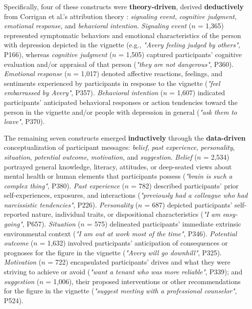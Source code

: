 Specifically, four of these constructs were \textbf{theory-driven}, derived \textbf{deductively} from Corrigan et al.'s attribution theory \cite{attribution_theory_corrigan_2000, theory_overview_corrigan_2002}: \textit{signaling event}, \textit{cognitive judgment}, \textit{emotional response}, and \textit{behavioral intention}.
\textit{Signaling event} ($n$ = 1,365) represented symptomatic behaviors and emotional characteristics of the person with depression depicted in the vignette (e.g., \textit{"Avery feeling judged by others"}, P166), whereas \textit{cognitive judgment} ($n$ = 1,505) captured participants' cognitive evaluation and/or appraisal of that person (\textit{"they are not dangerous"}, P360). 
\textit{Emotional response} ($n$ = 1,017) denoted affective reactions, feelings, and sentiments experienced by participants in response to the vignette (\textit{"feel embarrassed by Avery"}, P357). 
\textit{Behavioral intention} ($n$ = 1,607) indicated participants' anticipated behavioral responses or action tendencies toward the person in the vignette and/or people with depression in general (\textit{"ask them to leave"}, P370).


The remaining seven constructs emerged \textbf{inductively} through the \textbf{data-driven} conceptualization of participant messages: \textit{belief}, \textit{past experience}, \textit{personality}, \textit{situation}, \textit{potential outcome}, \textit{motivation}, and \textit{suggestion}.
\textit{Belief} \cite{belief_reviewer_peter_2021} ($n$ = 2,534) portrayed general knowledge, literacy, attitudes, or deep-seated views about mental health or human elements that participants possess (\textit{"brain is such a complex thing"}, P380). 
\textit{Past experience} \cite{factor_chandra_2007} ($n$ = 782) described participants' prior self-experiences, exposures, and interactions (\textit{"previously had a colleague who had narcissistic tendencies"}, P226). 
\textit{Personality} \cite{personality_reviewer_steiger_2022} ($n$ = 687) depicted participants' self-reported nature, individual traits, or dispositional characteristics (\textit{"I am easy-going"}, P657). 
\textit{Situation} \cite{situation_theory_rusch_2009} ($n$ = 575) delineated participants' immediate extrinsic environmental context (\textit{"I am out at work most of the time"}, P346). 
\textit{Potential outcome} ($n$ = 1,632) involved participants' anticipation of consequences or prognoses for the figure in the vignette (\textit{"Avery will go downhill"}, P325). 
\textit{Motivation} \cite{motivational_reviewer_kvaale_2016} ($n$ = 722) encapsulated participants' drives and what they were striving to achieve or avoid (\textit{"want a tenant who was more reliable"}, P339); and \textit{suggestion} ($n$ = 1,006), their proposed interventions or other recommendations for the figure in the vignette (\textit{"suggest meeting with a professional counselor"}, P524).



